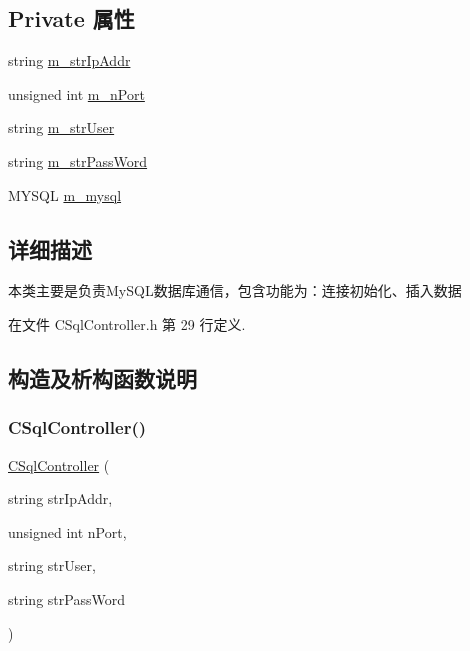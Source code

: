 \subsection*{Private 属性}
\begin{DoxyCompactItemize}
\item 
string \hyperlink{class_c_sql_controller_a519b317c415c5332553625ddddbaf086}{m\+\_\+str\+Ip\+Addr}
\item 
unsigned int \hyperlink{class_c_sql_controller_a00d4c1a5f4a0e9c3f9292e253f9d2617}{m\+\_\+n\+Port}
\item 
string \hyperlink{class_c_sql_controller_a720e2a21c33ace233a00d372fd1d8c4b}{m\+\_\+str\+User}
\item 
string \hyperlink{class_c_sql_controller_a2b14166e046098135ce342f5c43f90c9}{m\+\_\+str\+Pass\+Word}
\item 
M\+Y\+S\+QL \hyperlink{class_c_sql_controller_ab4ecd58f7fad1363f67f517c5b525324}{m\+\_\+mysql}
\end{DoxyCompactItemize}


\subsection{详细描述}
本类主要是负责\+My\+S\+Q\+L数据库通信，包含功能为：连接初始化、插入数据 

在文件 C\+Sql\+Controller.\+h 第 29 行定义.



\subsection{构造及析构函数说明}
\mbox{\label{class_c_sql_controller_af2913bc783bcdd1a27d112d11a033357}} 
\subsubsection{\texorpdfstring{C\+Sql\+Controller()}{CSqlController()}}
{\footnotesize\ttfamily \hyperlink{class_c_sql_controller}{C\+Sql\+Controller} (\begin{DoxyParamCaption}\item[{string}]{str\+Ip\+Addr,  }\item[{unsigned int}]{n\+Port,  }\item[{string}]{str\+User,  }\item[{string}]{str\+Pass\+Word }\end{DoxyParamCaption})}



